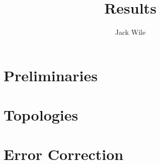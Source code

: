 \documentclass[12pt]{article}
\title{Results}
\author{Jack Wile}
\date{}
\begin{document}
\maketitle
\section{Preliminaries}


\section{Topologies}


\section{Error Correction}

\end{document}
